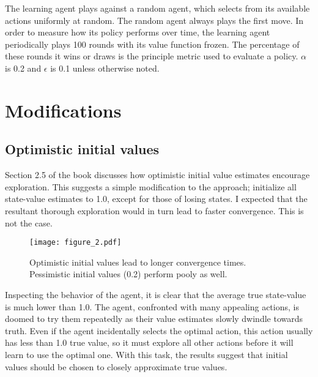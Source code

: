 \documentclass{article}
\begin{document}
	The learning agent plays against a random agent, which selects from its available actions uniformly at random. The random agent always plays the first move. In order to measure how its policy performs over time, the learning agent periodically plays 100 rounds with its value function frozen. The percentage of these rounds it wins or draws is the principle metric used to evaluate a policy. $\alpha$ is 0.2 and $\epsilon$ is 0.1 unless otherwise noted.
	
	
	
	\section{Modifications}
	
	\subsection{Optimistic initial values}
	
	Section 2.5 of the book discusses how optimistic initial value estimates encourage exploration. This suggests a simple modification to the approach; initialize all state-value estimates to 1.0, except for those of losing states. I expected that the resultant thorough exploration would in turn lead to faster convergence. This is not the case.
	
		\begin{figure}[h]
			\begin{center}
				\texttt{[image: figure\_2.pdf]}
				\caption{Optimistic initial values lead to longer convergence times. Pessimistic initial values (0.2) perform pooly as well.}
			\end{center}
		\end{figure}
	
	Inspecting the behavior of the agent, it is clear that the average true state-value is much lower than 1.0. The agent, confronted with many appealing actions, is doomed to try them repeatedly as their value estimates slowly dwindle towards truth. Even if the agent incidentally selects the optimal action, this action usually has less than 1.0 true value, so it must explore all other actions before it will learn to use the optimal one. With this task, the results suggest that initial values should be chosen to closely approximate true values.
\end{document}
